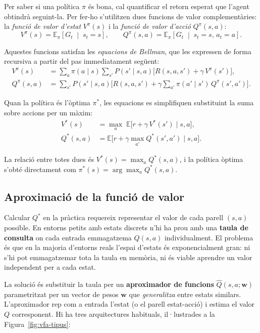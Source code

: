 Per saber si una política $\pi$ és bona, cal quantificar el retorn esperat
que l'agent obtindrà seguint-la. Per fer-ho s'utilitzen dues funcions de
valor complementàries: la \emph{funció de valor d'estat} $V^\pi(s)$ i la
\emph{funció de valor d'acció} $Q^\pi(s,a)$:
\[
  V^\pi(s) = \mathbb{E}_\pi\!\left[G_t \;\middle|\; s_t = s\right], \qquad
  Q^\pi(s,a) = \mathbb{E}_\pi\!\left[G_t \;\middle|\; s_t = s,\, a_t = a\right].
\]

Aquestes funcions satisfan les \emph{equacions de Bellman}, que les expressen
de forma recursiva a partir del pas immediatament següent:
\begin{align}
  V^\pi(s) &= \sum_{a} \pi(a \mid s)
              \sum_{s'} P(s' \mid s, a)
              \bigl[R(s,a,s') + \gamma\, V^\pi(s')\bigr], \label{eq:bellman-v}\\
  Q^\pi(s,a) &= \sum_{s'} P(s' \mid s, a)
               \bigl[R(s,a,s') + \gamma
               \sum_{a'}\pi(a' \mid s')\,Q^\pi(s',a')\bigr]. \label{eq:bellman-q}
\end{align}

Quan la política és l'òptima $\pi^*$, les equacions es simplifiquen
substituint la suma sobre accions per un màxim:
\begin{align}
  V^*(s)   &= \max_{a}\; \mathbb{E}\bigl[r + \gamma\, V^*(s')\mid s,a\bigr],
                         \label{eq:bellman-opt-v}\\
  Q^*(s,a) &= \mathbb{E}\bigl[r + \gamma \max_{a'} Q^*(s',a') \mid s,a\bigr].
                         \label{eq:bellman-opt-q}
\end{align}

La relació entre totes dues és $V^*(s) = \max_a Q^*(s,a)$, i la política
òptima s'obté directament com $\pi^*(s) = \arg\max_a Q^*(s,a)$.

\FloatBarrier
\subsection*{Aproximació de la funció de valor}

Calcular $Q^*$ en la pràctica requereix representar el valor de cada parell
$(s,a)$ possible. En entorns petits amb estats discrets n'hi ha prou amb una
\textbf{taula de consulta} on cada entrada emmagatzema $Q(s,a)$
individualment. El problema és que en la majoria d'entorns reals l'espai
d'estats és exponencialment gran: ni s'hi pot emmagatzemar tota la taula en
memòria, ni és viable aprendre un valor independent per a cada estat.

La solució és substituir la taula per un \textbf{aproximador de funcions}
$\hat{Q}(s,a;\mathbf{w})$ parametritzat per un vector de pesos $\mathbf{w}$
que \emph{generalitza} entre estats similars. L'aproximador rep com a entrada
l'estat (o el parell estat-acció) i estima el valor $Q$ corresponent. Hi ha
tres arquitectures habituals, il·lustrades a la
Figura~\ref{fig:vfa-tipus}:

